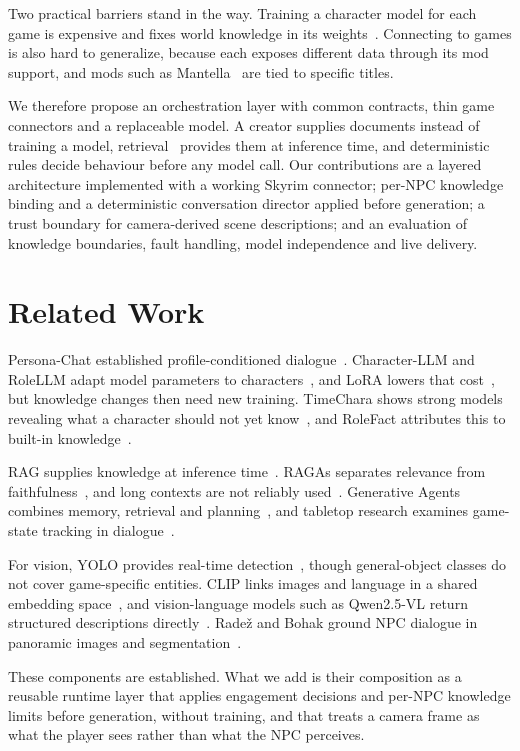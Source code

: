 \documentclass[conference]{IEEEtran}
\begin{document}
Two practical barriers stand in the way. Training a character model for each game is expensive and fixes world knowledge in its weights~\cite{shao2023,hu2022}. Connecting to games is also hard to generalize, because each exposes different data through its mod support, and mods such as Mantella~\cite{mantella} are tied to specific titles.

We therefore propose an orchestration layer with common contracts, thin game connectors and a replaceable model. A creator supplies documents instead of training a model, retrieval~\cite{lewis2020} provides them at inference time, and deterministic rules decide behaviour before any model call. Our contributions are a layered architecture implemented with a working Skyrim connector; per-NPC knowledge binding and a deterministic conversation director applied before generation; a trust boundary for camera-derived scene descriptions; and an evaluation of knowledge boundaries, fault handling, model independence and live delivery.

\section{Related Work}
Persona-Chat established profile-conditioned dialogue~\cite{zhang2018}. Character-LLM and RoleLLM adapt model parameters to characters~\cite{shao2023,wang2024}, and LoRA lowers that cost~\cite{hu2022}, but knowledge changes then need new training. TimeChara shows strong models revealing what a character should not yet know~\cite{ahn2024}, and RoleFact attributes this to built-in knowledge~\cite{sadeq2024}.

RAG supplies knowledge at inference time~\cite{lewis2020,karpukhin2020}. RAGAs separates relevance from faithfulness~\cite{es2024}, and long contexts are not reliably used~\cite{liu2024}. Generative Agents combines memory, retrieval and planning~\cite{park2023}, and tabletop research examines game-state tracking in dialogue~\cite{callison2022}.

For vision, YOLO provides real-time detection~\cite{redmon2016}, though general-object classes do not cover game-specific entities. CLIP links images and language in a shared embedding space~\cite{radford2021}, and vision-language models such as Qwen2.5-VL return structured descriptions directly~\cite{bai2025}. Rade\v{z} and Bohak ground NPC dialogue in panoramic images and segmentation~\cite{radez2026}.

These components are established. What we add is their composition as a reusable runtime layer that applies engagement decisions and per-NPC knowledge limits before generation, without training, and that treats a camera frame as what the player sees rather than what the NPC perceives.
\end{document}
